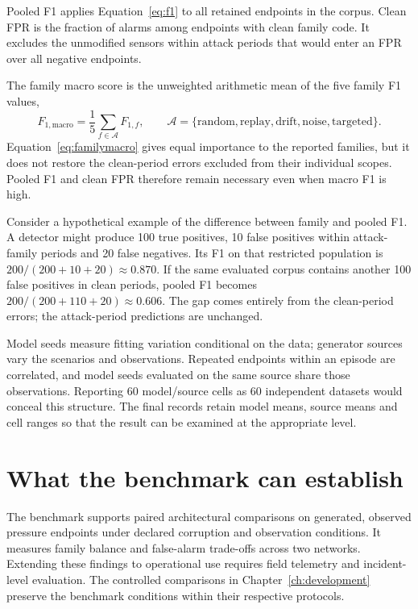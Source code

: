 Pooled F1 applies Equation~\eqref{eq:f1} to all retained endpoints in the corpus. Clean FPR is the fraction of alarms among endpoints with clean family code. It excludes the unmodified sensors within attack periods that would enter an FPR over all negative endpoints.

The family macro score is the unweighted arithmetic mean of the five family F1 values,
\begin{equation}
 F_{1,\mathrm{macro}}=\frac{1}{5}\sum_{f\in\mathcal A}F_{1,f},
 \qquad \mathcal A=\{\mathrm{random,replay,drift,noise,targeted}\}.\label{eq:familymacro}
\end{equation}
Equation~\eqref{eq:familymacro} gives equal importance to the reported families, but it does not restore the clean-period errors excluded from their individual scopes. Pooled F1 and clean FPR therefore remain necessary even when macro F1 is high.

Consider a hypothetical example of the difference between family and pooled F1. A detector might produce 100 true positives, 10 false positives within attack-family periods and 20 false negatives. Its F1 on that restricted population is $200/(200+10+20)\approx0.870$. If the same evaluated corpus contains another 100 false positives in clean periods, pooled F1 becomes $200/(200+110+20)\approx0.606$. The gap comes entirely from the clean-period errors; the attack-period predictions are unchanged.

Model seeds measure fitting variation conditional on the data; generator sources vary the scenarios and observations. Repeated endpoints within an episode are correlated, and model seeds evaluated on the same source share those observations. Reporting 60 model/source cells as 60 independent datasets would conceal this structure. The final records retain model means, source means and cell ranges so that the result can be examined at the appropriate level.

\enlargethispage{2\baselineskip}
\section{What the benchmark can establish}
The benchmark supports paired architectural comparisons on generated, observed pressure endpoints under declared corruption and observation conditions. It measures family balance and false-alarm trade-offs across two networks. Extending these findings to operational use requires field telemetry and incident-level evaluation. The controlled comparisons in Chapter~\ref{ch:development} preserve the benchmark conditions within their respective protocols.
